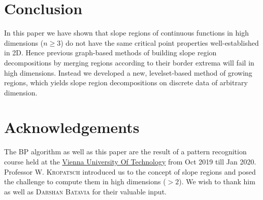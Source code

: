 \documentclass[11pt,twoside,twocolumn,a4paper]{article}
\theoremstyle{plain}
\theoremstyle{definition}
\begin{document}
\section{Conclusion}
In this paper we have shown that slope regions of continuous functions in high dimensions ($n\geq 3$) do not have the same critical point properties well-established in 2D.
Hence previous graph-based methods of building slope region decompositions by merging regions according to their border extrema will fail in high dimensions.
Instead we developed a new, levelset-based method of growing regions, which yields slope region decompositions on discrete data of arbitrary dimension.

\section{Acknowledgements}
The BP algorithm as well as this paper are the result of a pattern recognition course held at the \href{https://www.tuwien.at/en/}{Vienna University Of Technology} from Oct 2019 till Jan 2020. Professor \textsc{W. Kropatsch} introduced us to the concept of slope regions and posed the challenge to compute them in high dimensions ($>2$). We wish to thank him as well as \textsc{Darshan Batavia} for their valuable input.

{\small


}
\end{document}

